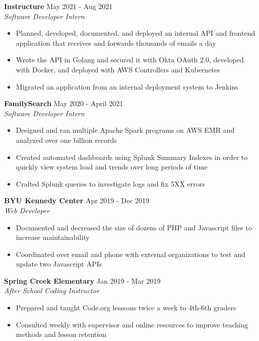 \documentclass[letterpaper]{article}
\begin{document}
\textbf{Instructure} \hfill May 2021 - Aug 2021\\
\textit{Software Developer Intern}\\
\vspace{-1mm}
\begin{itemize} \itemsep 1pt
	\item Planned, developed, documented, and deployed an internal API and frontend  application that receives and forwards thousands of emails a day
	\item Wrote the API in Golang and secured it with Okta OAuth 2.0, developed with Docker, and deployed with AWS Controllers and Kubernetes
	\item Migrated an application from an internal deployment system to Jenkins
\end{itemize}
\textbf{FamilySearch} \hfill May 2020 - April 2021\\
\textit{Software Developer Intern}\\
\vspace{-1mm}
\begin{itemize} \itemsep 1pt
	\item Designed and ran multiple Apache Spark programs on AWS EMR and analyzed over one billion records
	\item Created automated dashboards using Splunk Summary Indexes in order to quickly view system load and trends over long periods of time
	\item Crafted Splunk queries to investigate logs and fix 5XX errors
    
\end{itemize}
\textbf{BYU Kennedy Center} \hfill Apr 2019 - Dec 2019\\
\textit{Web Developer}\\
\vspace{-1mm}
\begin{itemize} \itemsep 1pt
	\item Documented and decreased the size of dozens of PHP and Javascript files to increase maintainability
	\item Coordinated over email and phone with external organizations to test and update two Javascript APIs
\end{itemize}
\textbf{Spring Creek Elementary} \hfill Jan 2019 - Mar 2019\\
\textit{After School Coding Instructor}\\
\vspace{-1mm}
\begin{itemize} \itemsep 1pt
	\item Prepared and taught Code.org lesssons twice a week to 4th-6th graders
	\item Consulted weekly with supervisor and online resources to improve teaching methods and lesson retention
\end{itemize}
\end{document}
